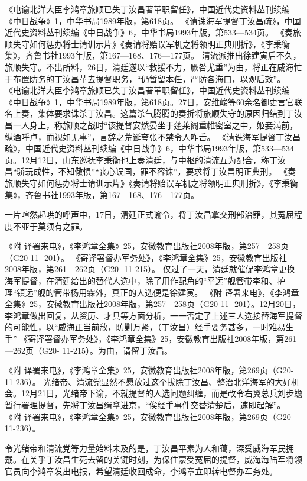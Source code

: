 \documentclass[12pt,UTF8]{ctexbook}
\begin{document}
《电谕北洋大臣李鸿章旅顺已失丁汝昌著革职留任》，中国近代史资料丛刊续编《中日战争》1，中华书局1989年版，第618页。
《请诛海军提督丁汝昌疏》，中国近代史资料丛刊续编《中日战争》6，中华书局1993年版，第533—534页。
《奏旅顺失守如何惩办将士请训示片》《奏请将贻误军机之将领明正典刑折》，《李秉衡集》，齐鲁书社1993年版，第167—168、176—177页。
清流派推出徐建寅后不久，旅顺失守。不出所料，26日，清廷遂以“救援不力，厥咎尤重”为由，将正在威海忙于布置防务的丁汝昌革去提督职务，“仍暂留本任，严防各海口，以观后效”。 《电谕北洋大臣李鸿章旅顺已失丁汝昌著革职留任》，中国近代史资料丛刊续编《中日战争》1，中华书局1989年版，第618页。27日，安维峻等60余名御史言官联名上奏，集体要求诛杀丁汝昌。这篇杀气腾腾的奏折将旅顺失守的原因归结到丁汝昌一人身上，称旅顺之战时“该提督安然晏坐于蓬莱阁重帷密室之中，姬妾满前，纵酒呼卢，而视如无事”，言辞之荒诞夸张不禁令人咋舌。 《请诛海军提督丁汝昌疏》，中国近代史资料丛刊续编《中日战争》6，中华书局1993年版，第533—534页。12月12日，山东巡抚李秉衡也上奏清廷，与中枢的清流互为配合，称丁汝昌“骄玩成性，不知儆惧”“丧心误国，罪不容诛”，要求将丁汝昌明正典刑。 《奏旅顺失守如何惩办将士请训示片》《奏请将贻误军机之将领明正典刑折》，《李秉衡集》，齐鲁书社1993年版，第167—168、176—177页。

一片喧然起哄的呼声中，17日，清廷正式谕令，将丁汝昌拿交刑部治罪，其冤屈程度不亚于莫须有之罪。

《附 译署来电》，《李鸿章全集》25，安徽教育出版社2008年版，第257—258页（G20-11- 201）。
《寄译署督办军务处》，《李鸿章全集》25，安徽教育出版社2008年版，第261—262页（G20- 11-215）。
仅过了一天，清廷就催促李鸿章更换海军提督，在清廷给出的替代人选中，除了用作配角的“平远”舰管带李和、护理“镇远”舰的管带杨用霖外，真正的人选便是徐建寅。 《附 译署来电》，《李鸿章全集》25，安徽教育出版社2008年版，第257—258页（G20-11- 201）。12月20日，李鸿章做出回复，从资历、才具等方面分析，一一否定了上述三人选接替海军提督的可能性，以“威海正当前敌，防剿万紧，（丁汝昌）经手要务甚多，一时难易生手” 《寄译署督办军务处》，《李鸿章全集》25，安徽教育出版社2008年版，第261—262页（G20- 11-215）。为由，请留丁汝昌。

《附 译署来电》，《李鸿章全集》25，安徽教育出版社2008年版，第269页（G20-11-236）。
光绪帝、清流党显然不愿放过这个拔除丁汝昌、整治北洋海军的大好机会。12月21日，光绪帝下谕，不就提督的人选问题纠缠，而是改令右翼总兵刘步蟾暂行署理提督，先将丁汝昌缉拿进京，“俟经手事件交替清楚后，速即起解”。 《附 译署来电》，《李鸿章全集》25，安徽教育出版社2008年版，第269页（G20-11-236）。

令光绪帝和清流党等力量始料未及的是，丁汝昌平素为人和蔼，深受威海军民拥戴。在关乎丁汝昌生死去留的关键时刻，为保住蒙受冤屈的提督，威海海陆军将领官员向李鸿章发出电报，希望清廷收回成命，李鸿章立即转电督办军务处。
\end{document}
